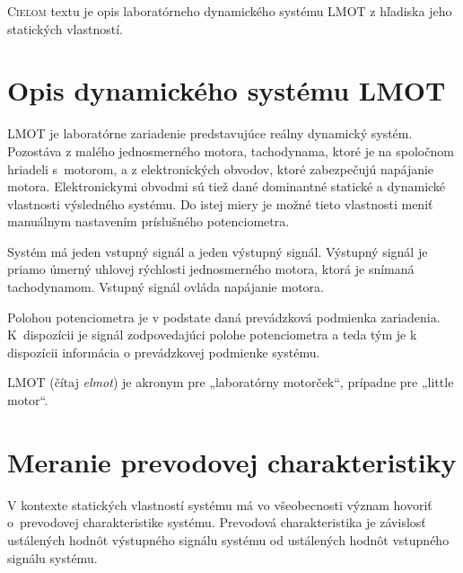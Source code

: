 \documentclass[a4paper, 10pt, ]{article}
\begin{document}
\bigskip

\normalsize
\normalfont

\lstset{style=mystyle}










\noindent
\lettrine[lines=1, nindent=1pt, loversize=0.0]{C}{ieľom} 
textu je opis laboratórneho dynamického systému LMOT z hľadiska jeho statických vlastností.


\section{Opis dynamického systému LMOT}

LMOT je laboratórne zariadenie predstavujúce reálny dynamický systém. Pozostáva z malého jednosmerného motora, tachodynama, ktoré je na spoločnom hriadeli s~motorom, a z elektronických obvodov, ktoré zabezpečujú napájanie motora. Elektronickymi obvodmi sú tiež dané dominantné statické a dynamické vlastnosti výsledného systému. Do istej miery je možné tieto vlastnosti meniť manuálnym nastavením príslušného potenciometra.

Systém má jeden vstupný signál a jeden výstupný signál. Výstupný signál je priamo úmerný uhlovej rýchlosti jednosmerného motora, ktorá je snímaná tachodynamom. Vstupný signál ovláda napájanie motora.

Polohou potenciometra je v podstate daná prevádzková podmienka zariadenia. K~dispozícii je signál zodpovedajúci polohe potenciometra a teda tým je k dispozícii informácia o prevádzkovej podmienke systému.

LMOT (čítaj \emph{elmot}) je akronym pre „laboratórny motorček“, prípadne pre „little motor“.



\section{Meranie prevodovej charakteristiky}

V kontexte statických vlastností systému má vo všeobecnosti význam hovoriť o~prevodovej charakteristike systému. Prevodová charakteristika je závislosť ustálených hodnôt výstupného signálu systému od ustálených hodnôt vstupného signálu systému.
\end{document}
